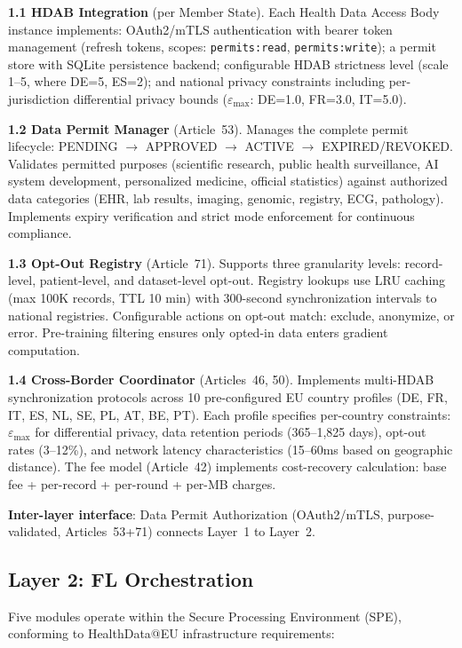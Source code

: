 \documentclass[conference,a4paper]{IEEEtran}
\begin{document}
\textbf{1.1 HDAB Integration} (per Member State). Each Health Data Access Body instance implements: OAuth2/mTLS authentication with bearer token management (refresh tokens, scopes: \texttt{permits:read}, \texttt{permits:write}); a permit store with SQLite persistence backend; configurable HDAB strictness level (scale 1--5, where DE=5, ES=2); and national privacy constraints including per-jurisdiction differential privacy bounds ($\varepsilon_{\max}$: DE=1.0, FR=3.0, IT=5.0).

\textbf{1.2 Data Permit Manager} (Article~53). Manages the complete permit lifecycle: PENDING $\to$ APPROVED $\to$ ACTIVE $\to$ EXPIRED/REVOKED. Validates permitted purposes (scientific research, public health surveillance, AI system development, personalized medicine, official statistics) against authorized data categories (EHR, lab results, imaging, genomic, registry, ECG, pathology). Implements expiry verification and strict mode enforcement for continuous compliance.

\textbf{1.3 Opt-Out Registry} (Article~71). Supports three granularity levels: record-level, patient-level, and dataset-level opt-out. Registry lookups use LRU caching (max 100K records, TTL 10 min) with 300-second synchronization intervals to national registries. Configurable actions on opt-out match: exclude, anonymize, or error. Pre-training filtering ensures only opted-in data enters gradient computation.

\textbf{1.4 Cross-Border Coordinator} (Articles~46, 50). Implements multi-HDAB synchronization protocols across 10 pre-configured EU country profiles (DE, FR, IT, ES, NL, SE, PL, AT, BE, PT). Each profile specifies per-country constraints: $\varepsilon_{\max}$ for differential privacy, data retention periods (365--1,825 days), opt-out rates (3--12\%), and network latency characteristics (15--60ms based on geographic distance). The fee model (Article~42) implements cost-recovery calculation: base fee + per-record + per-round + per-MB charges.

\textbf{Inter-layer interface}: Data Permit Authorization (OAuth2/mTLS, purpose-validated, Articles~53+71) connects Layer~1 to Layer~2.

\subsection{Layer 2: FL Orchestration}

Five modules operate within the Secure Processing Environment (SPE), conforming to HealthData@EU infrastructure requirements:
\end{document}
